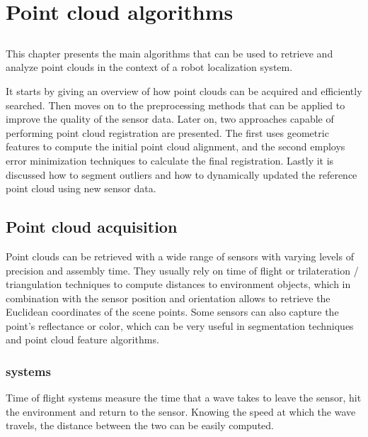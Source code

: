 \chapter{Point cloud algorithms}\label{chap:point-cloud-algorithms}



\section*{}

This chapter presents the main algorithms that can be used to retrieve and analyze point clouds in the context of a robot localization system.

It starts by giving an overview of how point clouds can be acquired and efficiently searched. Then moves on to the preprocessing methods that can be applied to improve the quality of the sensor data. Later on, two approaches capable of performing point cloud registration are presented. The first uses geometric features to compute the initial point cloud alignment, and the second employs error minimization techniques to calculate the final registration. Lastly it is discussed how to segment outliers and how to dynamically updated the reference point cloud using new sensor data.



\section{Point cloud acquisition}

Point clouds can be retrieved with a wide range of sensors with varying levels of precision and assembly time. They usually rely on time of flight or trilateration / triangulation techniques to compute distances to environment objects, which in combination with the sensor position and orientation allows to retrieve the Euclidean coordinates of the scene points. Some sensors can also capture the point's reflectance or color, which can be very useful in segmentation techniques and point cloud feature algorithms.


\subsection{ systems}

Time of flight systems measure the time that a wave takes to leave the sensor, hit the environment and return to the sensor. Knowing the speed at which the wave travels, the distance between the two can be easily computed.

